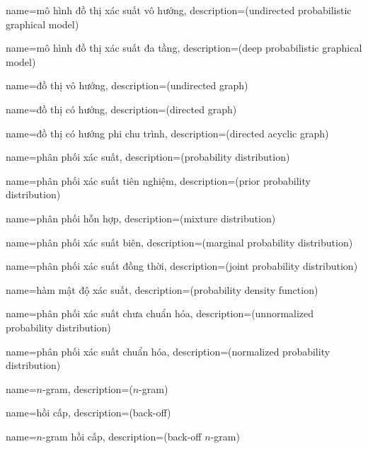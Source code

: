 {
    name={mô hình đồ thị xác suất vô hướng},
    description={(undirected probabilistic graphical model)}
}

{
    name={mô hình đồ thị xác suất đa tầng},
    description={(deep probabilistic graphical model)}
}

{
    name={đồ thị vô hướng},
    description={(undirected graph)}
}

{
    name={đồ thị có hướng},
    description={(directed graph)}
}

{
    name={đồ thị có hướng phi chu trình},
    description={(directed acyclic graph)}
}

{
    name={phân phối xác suất},
    description={(probability distribution)}
}

{
    name={phân phối xác suất tiên nghiệm},
    description={(prior probability distribution)}
}

{
    name={phân phối hỗn hợp},
    description={(mixture distribution)}
}

{
    name={phân phối xác suất biên},
    description={(marginal probability distribution)}
}

{
    name={phân phối xác suất đồng thời},
    description={(joint probability distribution)}
}

{
    name={hàm mật độ xác suất},
    description={(probability density function)}
}

{
    name={phân phối xác suất chưa chuẩn hóa},
    description={(unnormalized probability distribution)}
}

{
    name={phân phối xác suất chuẩn hóa},
    description={(normalized probability distribution)}
}

{
    name={$n$-gram},
    description={($n$-gram)}
}

{
    name={hồi cấp},
    description={(back-off)}
}

{
    name={$n$-gram hồi cấp},
    description={(back-off $n$-gram)}
}

